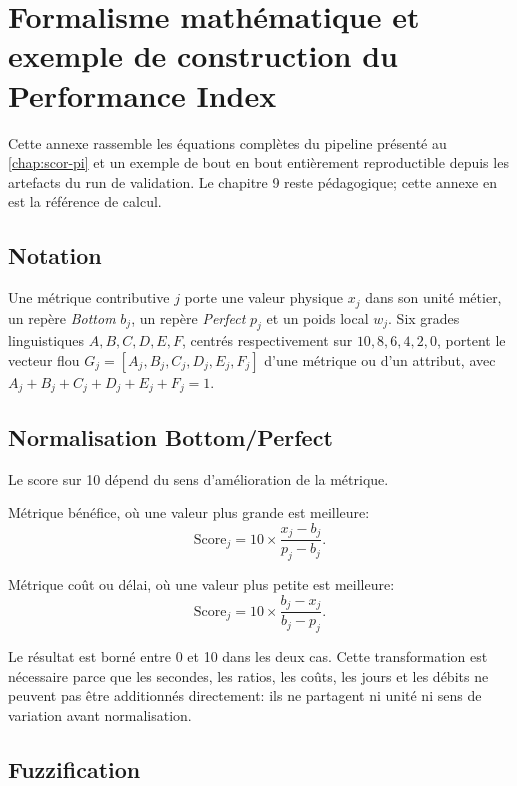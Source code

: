 \chapter{Formalisme mathématique et exemple de construction du Performance Index}
\label{ann:formalisme-pi}

Cette annexe rassemble les équations complètes du pipeline présenté au \cref{chap:scor-pi} et un exemple de bout en bout entièrement reproductible depuis les artefacts du run de validation. Le chapitre 9 reste pédagogique; cette annexe en est la référence de calcul.

\section{Notation}

Une métrique contributive $j$ porte une valeur physique $x_j$ dans son unité métier, un repère \emph{Bottom} $b_j$, un repère \emph{Perfect} $p_j$ et un poids local $w_j$. Six grades linguistiques $A, B, C, D, E, F$, centrés respectivement sur $10, 8, 6, 4, 2, 0$, portent le vecteur flou $G_j = [A_j, B_j, C_j, D_j, E_j, F_j]$ d'une métrique ou d'un attribut, avec $A_j+B_j+C_j+D_j+E_j+F_j = 1$.

\section{Normalisation Bottom/Perfect}

Le score sur 10 dépend du sens d'amélioration de la métrique.

Métrique bénéfice, où une valeur plus grande est meilleure:
\begin{equation}
\mathrm{Score}_j = 10 \times \frac{x_j - b_j}{p_j - b_j}.
\label{eq:score-benefit}
\end{equation}

Métrique coût ou délai, où une valeur plus petite est meilleure:
\begin{equation}
\mathrm{Score}_j = 10 \times \frac{b_j - x_j}{b_j - p_j}.
\label{eq:score-cost}
\end{equation}

Le résultat est borné entre 0 et 10 dans les deux cas. Cette transformation est nécessaire parce que les secondes, les ratios, les coûts, les jours et les débits ne peuvent pas être additionnés directement: ils ne partagent ni unité ni sens de variation avant normalisation.

\section{Fuzzification}

